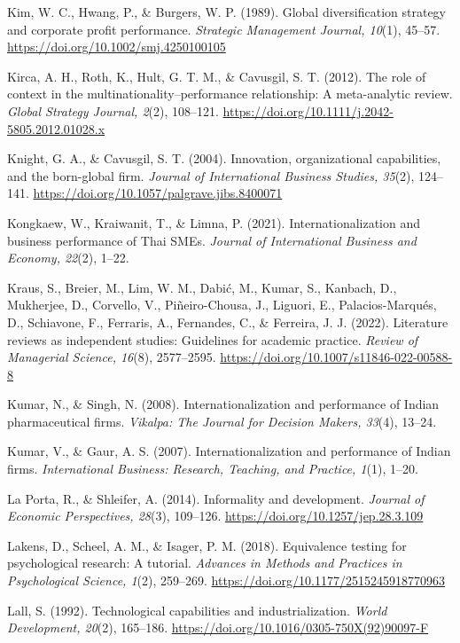 \documentclass[
  a4paper,
  13pt]{extreport}
\begin{document}
Kim, W. C., Hwang, P., \& Burgers, W. P. (1989). Global diversification
strategy and corporate profit performance. \emph{Strategic Management
Journal, 10}(1), 45--57. \url{https://doi.org/10.1002/smj.4250100105}

Kirca, A. H., Roth, K., Hult, G. T. M., \& Cavusgil, S. T. (2012). The
role of context in the multinationality--performance relationship: A
meta-analytic review. \emph{Global Strategy Journal, 2}(2), 108--121.
\url{https://doi.org/10.1111/j.2042-5805.2012.01028.x}

Knight, G. A., \& Cavusgil, S. T. (2004). Innovation, organizational
capabilities, and the born-global firm. \emph{Journal of International
Business Studies, 35}(2), 124--141.
\url{https://doi.org/10.1057/palgrave.jibs.8400071}

Kongkaew, W., Kraiwanit, T., \& Limna, P. (2021). Internationalization
and business performance of Thai SMEs. \emph{Journal of International
Business and Economy, 22}(2), 1--22.

Kraus, S., Breier, M., Lim, W. M., Dabić, M., Kumar, S., Kanbach, D.,
Mukherjee, D., Corvello, V., Piñeiro-Chousa, J., Liguori, E.,
Palacios-Marqués, D., Schiavone, F., Ferraris, A., Fernandes, C., \&
Ferreira, J. J. (2022). Literature reviews as independent studies:
Guidelines for academic practice. \emph{Review of Managerial Science,
16}(8), 2577--2595. \url{https://doi.org/10.1007/s11846-022-00588-8}

Kumar, N., \& Singh, N. (2008). Internationalization and performance of
Indian pharmaceutical firms. \emph{Vikalpa: The Journal for Decision
Makers, 33}(4), 13--24.

Kumar, V., \& Gaur, A. S. (2007). Internationalization and performance
of Indian firms. \emph{International Business: Research, Teaching, and
Practice, 1}(1), 1--20.

La Porta, R., \& Shleifer, A. (2014). Informality and development.
\emph{Journal of Economic Perspectives, 28}(3), 109--126.
\url{https://doi.org/10.1257/jep.28.3.109}

Lakens, D., Scheel, A. M., \& Isager, P. M. (2018). Equivalence testing
for psychological research: A tutorial. \emph{Advances in Methods and
Practices in Psychological Science, 1}(2), 259--269.
\url{https://doi.org/10.1177/2515245918770963}

Lall, S. (1992). Technological capabilities and industrialization.
\emph{World Development, 20}(2), 165--186.
\url{https://doi.org/10.1016/0305-750X(92)90097-F}
\end{document}
